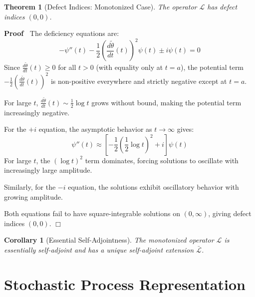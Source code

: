 \documentclass{article}
\newenvironment{proof}{\noindent\textbf{Proof\ }}{\hspace*{\fill}$\Box$\medskip}
\newtheorem{corollary}{Corollary}
\newtheorem{theorem}{Theorem}
\begin{document}
\begin{theorem}
  [Defect Indices: Monotonized Case] The operator $\mathcal{L}$ has defect
  indices $(0, 0)$.
\end{theorem}

\begin{proof}
  The deficiency equations are:
  \begin{equation}
    - \psi'' (t) - \frac{1}{2} \left( \frac{d \tilde{\theta}}{dt} (t)
    \right)^2 \psi (t) \pm i \psi (t) = 0
  \end{equation}
  Since $\frac{d \tilde{\theta}}{dt} (t) \geq 0$ for all $t > 0$ (with
  equality only at $t = a$), the potential term $- \frac{1}{2} \left( \frac{d
  \tilde{\theta}}{dt} (t) \right)^2$ is non-positive everywhere and strictly
  negative except at $t = a$.
  
  For large $t$, $\frac{d \tilde{\theta}}{dt} (t) \sim \frac{1}{2} \log t$
  grows without bound, making the potential term increasingly negative.
  
  For the $+ i$ equation, the asymptotic behavior as $t \to \infty$ gives:
  \begin{equation}
    \psi'' (t) \approx \left[ - \frac{1}{2}  \left( \frac{1}{2} \log t
    \right)^2 + i \right] \psi (t)
  \end{equation}
  For large $t$, the $(\log t)^2$ term dominates, forcing solutions to
  oscillate with increasingly large amplitude.
  
  Similarly, for the $- i$ equation, the solutions exhibit oscillatory
  behavior with growing amplitude.
  
  Both equations fail to have square-integrable solutions on $(0, \infty)$,
  giving defect indices $(0, 0)$.
\end{proof}

\begin{corollary}
  [Essential Self-Adjointness] The monotonized operator $\mathcal{L}$ is
  essentially self-adjoint and has a unique self-adjoint extension
  $\bar{\mathcal{L}}$.
\end{corollary}

\section{Stochastic Process Representation}
\end{document}
